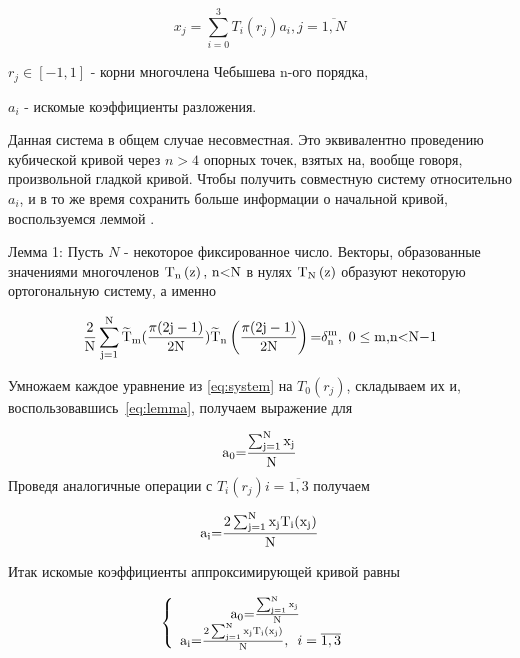 \documentclass[a4paper,12pt]{report}
\begin{document}
\begin{equation} \label{eq:system} 
x_j= \sum^3_{i=0}{T_i(r_j)a_i},       j=\overline{1,N}
\end{equation}

$r_j\in [-1,1]$ - корни многочлена Чебышева n-ого  порядка,

$a_i$ - искомые коэффициенты разложения.

Данная система в общем случае несовместная. Это эквивалентно проведению кубической кривой через $n>4$ опорных точек, взятых на, вообще говоря, произвольной гладкой кривой. Чтобы получить совместную систему относительно $a_i$, и в то же время сохранить больше информации о начальной кривой, воспользуемся леммой \cite{chislmetod}.

\vspace{0.3cm}

Лемма 1: Пусть $N$ - некоторое фиксированное число. Векторы, образованные значениями многочленов ${{\rm T}}_{{\rm n}}\left({\rm z}\right){\rm ,\ }{\rm n}{\rm <}{\rm N}$ в нулях  ${{\rm T}}_{{\rm N}}\left({\rm z}\right)$ образуют некоторую ортогональную систему, а именно 

\begin{equation} \label{eq:lemma} 
\frac{{\rm 2}}{{\rm N}}\sum^{{\rm N}}_{{\rm j=1}}{{\widetilde{{\rm T}}}_{{\rm m}}{\rm (}\frac{\pi {\rm (2j-1)}}{{\rm 2N}}{\rm )}}{\widetilde{{\rm T}}}_{{\rm n}}\left(\frac{\pi {\rm (2j-1)}}{{\rm 2N}}\right){\rm =}{\delta }^{{\rm m}}_{{\rm n}}{\rm ,\ 0}\le {\rm m,}{\rm n}{\rm <}{\rm N}{\rm -}{\rm 1}
\end{equation}

\vspace{0.3cm}

Умножаем каждое уравнение из \ref{eq:system} на $T_0(r_j)$, складываем их и, воспользовавшись~\ref{eq:lemma}, получаем выражение для 

\[{{\rm a}}_0{\rm =}\frac{\sum^{{\rm N}}_{{\rm j=1}}{{{\rm x}}_{{\rm j}}}}{{\rm N}}\] 
Проведя аналогичные операции с $T_i(r_j) i=\overline{1,3}$  получаем

\[{{\rm a}}_{{\rm i}}{\rm =}\frac{{\rm 2}\sum^{{\rm N}}_{{\rm j=1}}{{{\rm x}}_{{\rm j}}{{\rm T}}_{{\rm i}}{\rm (}{{\rm x}}_{{\rm j}}{\rm )}}}{{\rm N}}\] 

Итак искомые коэффициенты аппроксимирующей кривой равны

\begin{equation} \label{eq:coeff} 
\left\{ \begin{array}{c}
{{\rm a}}_0{\rm =}\frac{\sum^{{\rm N}}_{{\rm j=1}}{{{\rm x}}_{{\rm j}}}}{{\rm N}} \\ 
{{\rm a}}_{{\rm i}}{\rm =}\frac{{\rm 2}\sum^{{\rm N}}_{{\rm j=1}}{{{\rm x}}_{{\rm j}}{{\rm T}}_{{\rm i}}{\rm (}{{\rm x}}_{{\rm j}}{\rm )}}}{{\rm N}}{\rm ,\ \ }i=\overline{1,3}{\rm \ \ } \end{array}
\right. 
\end{equation} 
\end{document}
